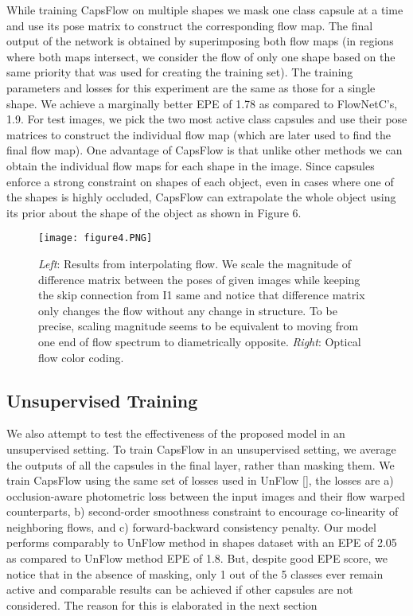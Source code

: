 \documentclass[11pt]{article}
\begin{document}
While training CapsFlow on multiple shapes we mask
one class capsule at a time and use its pose matrix to construct the corresponding flow map. The final output of the
network is obtained by superimposing both flow maps (in
regions where both maps intersect, we consider the flow of
only one shape based on the same priority that was used
for creating the training set). The training parameters and
losses for this experiment are the same as those for a single shape. We achieve a marginally better EPE of 1.78 as
compared to FlowNetC’s, 1.9. For test images, we pick the
two most active class capsules and use their pose matrices
to construct the individual flow map (which are later used
to find the final flow map). One advantage of CapsFlow is
that unlike other methods we can obtain the individual flow
maps for each shape in the image. Since capsules enforce
a strong constraint on shapes of each object, even in cases
where one of the shapes is highly occluded, CapsFlow can
extrapolate the whole object using its prior about the shape
of the object as shown in Figure 6.

\begin{figure}
\centering
\texttt{[image: figure4.PNG]}
\caption{\textit{Left}: Results from interpolating flow. We scale
the magnitude of difference matrix between the poses of
given images while keeping the skip connection from I1
same and notice that difference matrix only changes the
flow without any change in structure. To be precise, scaling
magnitude seems to be equivalent to moving from one end
of flow spectrum to diametrically opposite. \textit{Right}: Optical
flow color coding.
}
\end{figure}

\subsection{Unsupervised Training}
We also attempt to test the effectiveness of the proposed
model in an unsupervised setting. To train CapsFlow in
an unsupervised setting, we average the outputs of all the
capsules in the final layer, rather than masking them. We train CapsFlow using the same set of losses used in UnFlow [\cite{11}], the losses are a) occlusion-aware photometric
loss between the input images and their flow warped counterparts, b) second-order smoothness constraint to encourage co-linearity of neighboring flows, and c) forward-backward consistency penalty. Our model performs comparably
to UnFlow method in shapes dataset with an EPE of 2.05 as
compared to UnFlow method EPE of 1.8. But, despite good
EPE score, we notice that in the absence of masking, only
1 out of the 5 classes ever remain active and comparable results can be achieved if other capsules are not considered.
The reason for this is elaborated in the next section
\end{document}
